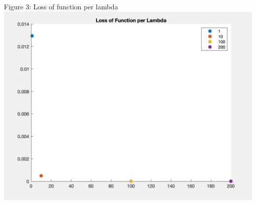 \documentclass[11pt]{article}
\begin{document}
\begin{enumerate}
Figure 3: Loss of function per lambda\\
\includegraphics[scale=.55]{Loss_ridge}
\end{enumerate}


	
\end{document}
